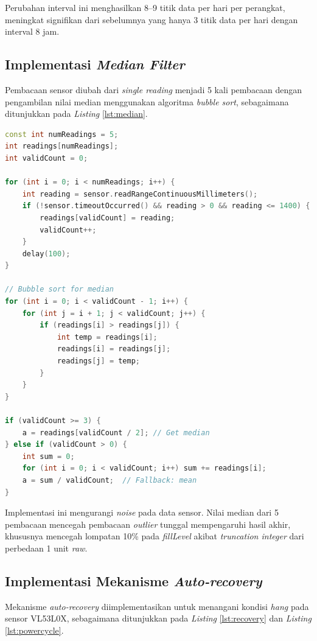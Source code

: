 Perubahan interval ini menghasilkan 8--9 titik data per hari per perangkat, meningkat signifikan dari sebelumnya yang hanya 3 titik data per hari dengan interval 8 jam.

\subsection{Implementasi \textit{Median Filter}}

Pembacaan sensor diubah dari \textit{single reading} menjadi 5 kali pembacaan dengan pengambilan nilai median menggunakan algoritma \textit{bubble sort}, sebagaimana ditunjukkan pada \textit{Listing} \ref{lst:median}.

\begin{lstlisting}[caption={Implementasi \textit{Median Filter} pada Pembacaan Sensor}, label={lst:median}, language=C++]
const int numReadings = 5;
int readings[numReadings];
int validCount = 0;

for (int i = 0; i < numReadings; i++) {
    int reading = sensor.readRangeContinuousMillimeters();
    if (!sensor.timeoutOccurred() && reading > 0 && reading <= 1400) {
        readings[validCount] = reading;
        validCount++;
    }
    delay(100);
}

// Bubble sort for median
for (int i = 0; i < validCount - 1; i++) {
    for (int j = i + 1; j < validCount; j++) {
        if (readings[i] > readings[j]) {
            int temp = readings[i];
            readings[i] = readings[j];
            readings[j] = temp;
        }
    }
}

if (validCount >= 3) {
    a = readings[validCount / 2]; // Get median
} else if (validCount > 0) {
    int sum = 0;
    for (int i = 0; i < validCount; i++) sum += readings[i];
    a = sum / validCount;  // Fallback: mean
}
\end{lstlisting}

Implementasi ini mengurangi \textit{noise} pada data sensor. Nilai median dari 5 pembacaan mencegah pembacaan \textit{outlier} tunggal mempengaruhi hasil akhir, khususnya mencegah lompatan 10\% pada \textit{fillLevel} akibat \textit{truncation integer} dari perbedaan 1 unit \textit{raw}.

\subsection{Implementasi Mekanisme \textit{Auto-recovery}}

Mekanisme \textit{auto-recovery} diimplementasikan untuk menangani kondisi \textit{hang} pada sensor VL53L0X, sebagaimana ditunjukkan pada \textit{Listing} \ref{lst:recovery} dan \textit{Listing} \ref{lst:powercycle}.


